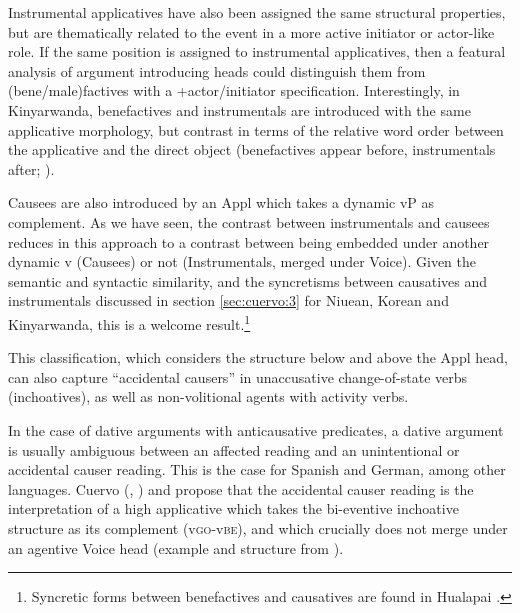 \documentclass[output=paper,colorlinks,citecolor=brown,nonflat]{./langscibook}
\begin{document}
Instrumental applicatives have also been assigned the same structural properties, but are thematically related to the event in a more active initiator or actor-like role. If the same position is assigned to instrumental applicatives, then a featural analysis of argument introducing heads could distinguish them from (bene/male)factives with a +actor/initiator specification. Interestingly, in Kinyarwanda, benefactives and instrumentals are introduced with the same applicative morphology, but contrast in terms of the relative word order between the applicative and the direct object (benefactives appear before, instrumentals after; \citealt{McGinnisGerdts2004}).

Causees are also introduced by an Appl which takes a dynamic vP as complement. As we have seen, the contrast between instrumentals and causees reduces in this approach to a contrast between being embedded under another dynamic v (Causees) or not (Instrumentals, merged under Voice). Given the semantic and syntactic similarity, and the syncretisms between causatives and instrumentals discussed in section \ref{sec:cuervo:3} for Niuean, Korean and Kinyarwanda, this is a welcome result.\footnote{Syncretic forms between benefactives and causatives are found in Hualapai \citep{Peterson2007}.} 

This classification, which considers the structure below and above the Appl head, can also capture “accidental causers” in unaccusative change-of-state verbs (inchoatives), as well as non-volitional agents with activity verbs.  

In the case of dative arguments with anticausative predicates, a dative argument is usually ambiguous between an affected reading and an unintentional or accidental causer reading. This is the case for Spanish and German, among other languages. Cuervo (\citeyear{Cuervo2003}, \citeyear{Cuervo2014}) and \citet{Schäfer2008} propose that the accidental causer reading is the interpretation of a high applicative which takes the bi-eventive inchoative structure as its complement (v\textsc{go}-v\textsc{be}), and which crucially does not merge under an agentive Voice head (example and structure from \citealt[166-167]{Cuervo2003}). 
\end{document}
